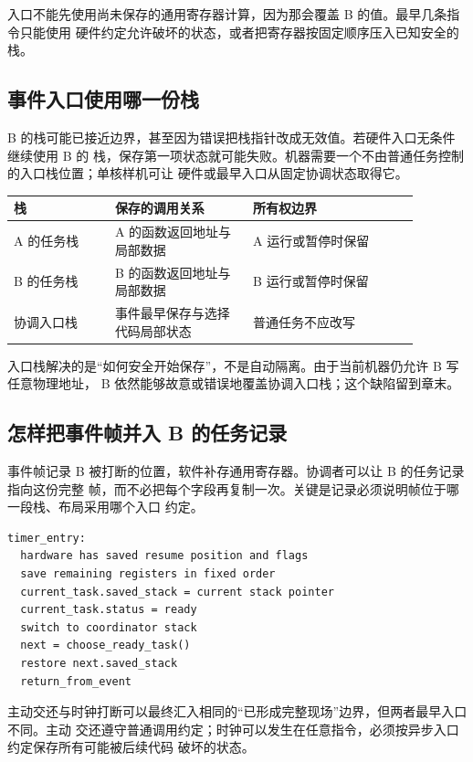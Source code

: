 入口不能先使用尚未保存的通用寄存器计算，因为那会覆盖 B 的值。最早几条指令只能使用
硬件约定允许破坏的状态，或者把寄存器按固定顺序压入已知安全的栈。

\subsection{事件入口使用哪一份栈}

B 的栈可能已接近边界，甚至因为错误把栈指针改成无效值。若硬件入口无条件继续使用 B 的
栈，保存第一项状态就可能失败。机器需要一个不由普通任务控制的入口栈位置；单核样机可让
硬件或最早入口从固定协调状态取得它。

\begin{longtable}{|L{0.22\linewidth}|L{0.30\linewidth}|L{0.36\linewidth}|}
\hline
{}
栈 & 保存的调用关系 & 所有权边界 \\ \hline
A 的任务栈 & A 的函数返回地址与局部数据 & A 运行或暂停时保留 \\ \hline
B 的任务栈 & B 的函数返回地址与局部数据 & B 运行或暂停时保留 \\ \hline
协调入口栈 & 事件最早保存与选择代码局部状态 & 普通任务不应改写 \\ \hline
\end{longtable}

入口栈解决的是“如何安全开始保存”，不是自动隔离。由于当前机器仍允许 B 写任意物理地址，
B 依然能够故意或错误地覆盖协调入口栈；这个缺陷留到章末。

\subsection{怎样把事件帧并入 B 的任务记录}

事件帧记录 B 被打断的位置，软件补存通用寄存器。协调者可以让 B 的任务记录指向这份完整
帧，而不必把每个字段再复制一次。关键是记录必须说明帧位于哪一段栈、布局采用哪个入口
约定。

\begin{lstlisting}
timer_entry:
  hardware has saved resume position and flags
  save remaining registers in fixed order
  current_task.saved_stack = current stack pointer
  current_task.status = ready
  switch to coordinator stack
  next = choose_ready_task()
  restore next.saved_stack
  return_from_event
\end{lstlisting}

主动交还与时钟打断可以最终汇入相同的“已形成完整现场”边界，但两者最早入口不同。主动
交还遵守普通调用约定；时钟可以发生在任意指令，必须按异步入口约定保存所有可能被后续代码
破坏的状态。


